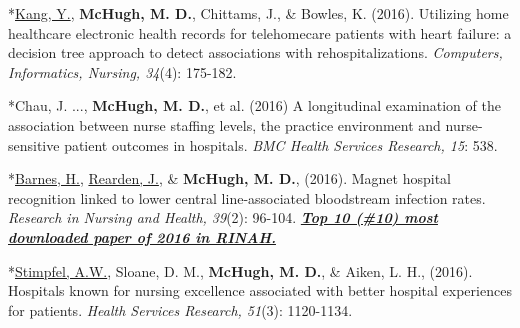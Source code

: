 \documentclass[10pt,]{article}
\begin{document}
{{{{{{{{{{{{{{{\begin{hangparas}{.25in}{1}
\end{hangparas}

\vspace{4mm}

\begin{hangparas}{.25in}{1}

*{\underline {Kang, Y.}}, {\textbf {McHugh, M. D.}}, Chittams, J., \& Bowles, K. (2016). Utilizing home healthcare electronic health records for telehomecare patients with heart failure: a decision tree approach to detect associations with rehospitalizations. {\textit {Computers, Informatics, Nursing, 34}}(4): 175-182.

\end{hangparas}

\vspace{4mm}

\begin{hangparas}{.25in}{1}

*Chau, J. ..., {\textbf {McHugh, M. D.}}, et al. (2016) A longitudinal examination of the association between nurse staffing levels, the practice environment and nurse-sensitive patient outcomes in hospitals. {\textit {BMC Health Services Research, 15}}: 538.

\end{hangparas}

\vspace{4mm}

\begin{hangparas}{.25in}{1}

*{\underline {Barnes, H.}}, {\underline {Rearden, J.}}, \& {\textbf {McHugh, M. D.}}, (2016). Magnet hospital recognition linked to lower central line-associated bloodstream infection rates. {\textit {Research in Nursing and Health, 39}}(2): 96-104. {\textit {\textbf {\underline {Top 10 (\#10) most downloaded paper of 2016 in RINAH.}}}}

\end{hangparas}

\vspace{4mm}

\begin{hangparas}{.25in}{1}

*{\underline {Stimpfel, A.W.}}, Sloane, D. M., {\textbf {McHugh, M. D.}}, \& Aiken, L. H., (2016). Hospitals known for nursing excellence associated with better hospital experiences for patients. {\textit {Health Services Research, 51}}(3): 1120-1134.

\end{hangparas}

}}}}}}}}}}}}}}}
\end{document}
